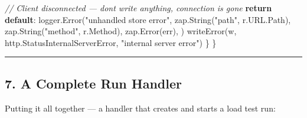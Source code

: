 \documentclass[
]{article}
\newenvironment{Shaded}{}{}
\newcommand{\CommentTok}[1]{\textcolor[rgb]{0.38,0.63,0.69}{\textit{#1}}}
\newcommand{\ControlFlowTok}[1]{\textcolor[rgb]{0.00,0.44,0.13}{\textbf{#1}}}
\newcommand{\NormalTok}[1]{#1}
\newcommand{\OperatorTok}[1]{\textcolor[rgb]{0.40,0.40,0.40}{#1}}
\newcommand{\StringTok}[1]{\textcolor[rgb]{0.25,0.44,0.63}{#1}}
\begin{document}
\begin{Shaded}
\begin{Highlighting}[]
        \CommentTok{// Client disconnected — don\textquotesingle{}t write anything, connection is gone}
        \ControlFlowTok{return}
    \ControlFlowTok{default}\OperatorTok{:}
\NormalTok{        logger}\OperatorTok{.}\NormalTok{Error}\OperatorTok{(}\StringTok{"unhandled store error"}\OperatorTok{,}
\NormalTok{            zap}\OperatorTok{.}\NormalTok{String}\OperatorTok{(}\StringTok{"path"}\OperatorTok{,}\NormalTok{ r}\OperatorTok{.}\NormalTok{URL}\OperatorTok{.}\NormalTok{Path}\OperatorTok{),}
\NormalTok{            zap}\OperatorTok{.}\NormalTok{String}\OperatorTok{(}\StringTok{"method"}\OperatorTok{,}\NormalTok{ r}\OperatorTok{.}\NormalTok{Method}\OperatorTok{),}
\NormalTok{            zap}\OperatorTok{.}\NormalTok{Error}\OperatorTok{(}\NormalTok{err}\OperatorTok{),}
        \OperatorTok{)}
\NormalTok{        writeError}\OperatorTok{(}\NormalTok{w}\OperatorTok{,}\NormalTok{ http}\OperatorTok{.}\NormalTok{StatusInternalServerError}\OperatorTok{,} \StringTok{"internal server error"}\OperatorTok{)}
    \OperatorTok{\}}
\OperatorTok{\}}
\end{Highlighting}
\end{Shaded}

\begin{center}\rule{0.5\linewidth}{0.5pt}\end{center}

\hypertarget{a-complete-run-handler}{%
\subsection{7. A Complete Run Handler}\label{a-complete-run-handler}}

Putting it all together --- a handler that creates and starts a load
test run:
\end{document}
